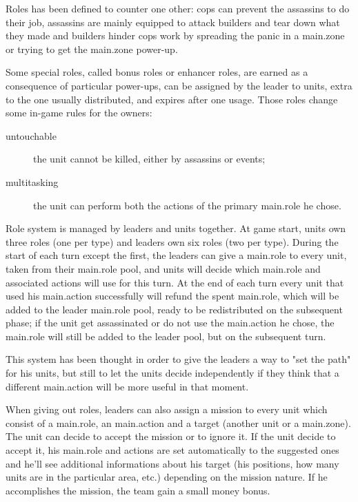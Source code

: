 			Roles has been defined to counter one other: cops can prevent the assassins to do their job, assassins are mainly equipped to attack builders and tear down what they made and builders hinder cops work by spreading the panic in a main.zone or trying to get the main.zone power-up.
			
			Some special roles, called bonus roles or enhancer roles, are earned as a consequence of particular power-ups, can be assigned by the leader to units, extra to the one usually distributed, and expires after one usage.
			Those roles change some in-game rules for the owners:
			\begin{description}
				\item[untouchable] the unit cannot be killed, either by assassins or events;
				\item[multitasking] the unit can perform both the actions of the primary main.role he chose.
			\end{description} 
			
			Role system is managed by leaders and units together.
			At game start, units own three roles (one per type) and leaders own six roles (two per type).
			During the start of each turn except the first, the leaders can give a main.role to every unit, taken from their main.role pool, and units will decide which main.role and associated actions will use for this turn.
			At the end of each turn every unit that used his main.action successfully will refund the spent main.role, which will be added to the leader main.role pool, ready to be redistributed on the subsequent phase; if the unit get assassinated or do not use the main.action he chose, the main.role will still be added to the leader pool, but on the subsequent turn.
			
			This system has been thought in order to give the leaders a way to "set the path" for his units, but still to let the units decide independently if they think that a different main.action will be more useful in that moment.
		
			
			When giving out roles, leaders can also assign a mission to every unit which consist of a main.role, an main.action and a target (another unit or a main.zone).
			The unit can decide to accept the mission or to ignore it. If the unit decide to accept it, his main.role and actions are set automatically to the suggested ones and he'll see additional informations about his target (his positions, how many units are in the particular area, etc.) depending on the mission nature. If he accomplishes the mission, the team gain a small money bonus.
			
